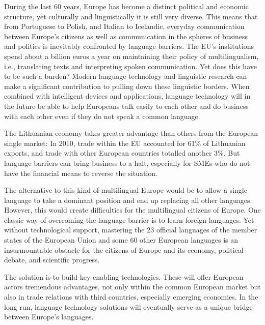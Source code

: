 \begin{multicols}{2}

During the last 60 years, Europe has become a distinct political and economic structure, yet culturally and linguistically it is still very diverse. This means that from Portuguese to Polish, and Italian to Icelandic, everyday communication between Europe’s citizens as well as communication in the spheres of business and politics is inevitably confronted by language barriers. The EU’s institutions spend about a billion euros a year on maintaining their policy of multilingualism, i.e., translating texts and interpreting spoken communication. Yet does this have to be such a burden? Modern language technology and linguistic research can make a significant contribution to pulling down these linguistic borders. When combined with intelligent devices and applications, language technology will in the future be able to help Europeans talk easily to each other and do business with each other even if they do not speak a common language.


The Lithuanian economy takes greater advantage than others from the European single market: In 2010, trade within the EU accounted for 61\% of Lithuanian exports, and trade with other European countries totalled another 3\%. But language barriers can bring business to a halt, especially for SMEs who do not have the financial means to reverse the situation.

The alternative to this kind of multilingual Europe would be to allow a single language to take a dominant position and end up replacing all other languages. However, this would create difficulties for the multilingual citizens of Europe.
One classic way of overcoming the language barrier is to learn foreign languages. Yet without technological support, mastering the 23 official languages of the member states of the European Union and some 60 other European languages is an insurmountable obstacle for the citizens of Europe and its economy, political debate, and scientific progress.

The solution is to build key enabling technologies. These will offer European actors tremendous advantages, not only within the common European market but also in trade relations with third countries, especially emerging economies. In the long run, language technology solutions will eventually serve as a unique bridge between Europe’s languages.



\end{multicols}
